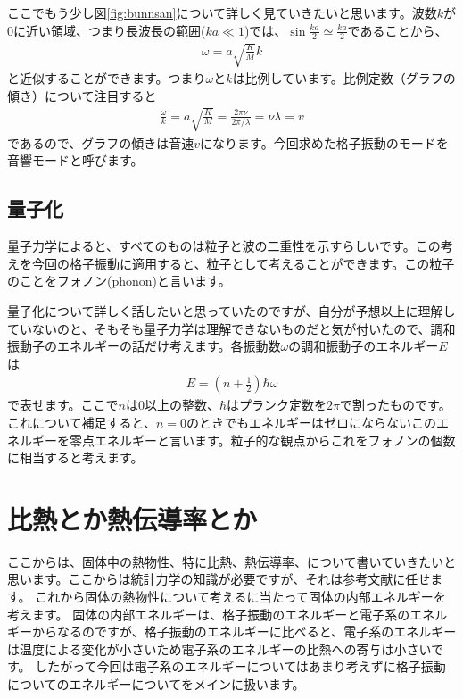 \documentclass[10pt,b5paper,papersize,dvipdfmx]{jsbook}
\begin{document}
ここでもう少し図\ref{fig:bunnsan}について詳しく見ていきたいと思います。波数$k$が$0$に近い領域、つまり長波長の範囲($ka \ll 1$)では、$\sin \frac{ka}{2} \simeq \frac{ka}{2}$であることから、
\begin{align}
  \omega = a \sqrt{\frac{K}{M}}k
\end{align}
と近似することができます。つまり$\omega$と$k$は比例しています。比例定数（グラフの傾き）について注目すると
\begin{align}
  \frac{\omega}{k} =a \sqrt{\frac{K}{M}}= \frac{2\pi\nu}{2\pi/\lambda} = \nu \lambda = v
\end{align}
であるので、グラフの傾きは音速$v$になります。今回求めた格子振動のモードを音響モードと呼びます。

\subsection{量子化}
量子力学によると、すべてのものは粒子と波の二重性を示すらしいです。この考えを今回の格子振動に適用すると、粒子として考えることができます。この粒子のことをフォノン(phonon)と言います。\par
量子化について詳しく話したいと思っていたのですが、自分が予想以上に理解していないのと、そもそも量子力学は理解できないものだと気が付いたので、調和振動子のエネルギーの話だけ考えます。各振動数$\omega$の調和振動子のエネルギー$E$は
\begin{align}
  E = \left(n + \frac{1}{2}\right)\hbar \omega
\end{align}
で表せます。ここで$n$は0以上の整数、$\hbar$はプランク定数を$2\pi$で割ったものです。これについて補足すると、$n = 0$のときでもエネルギーはゼロにならないこのエネルギーを零点エネルギーと言います。粒子的な観点からこれをフォノンの個数に相当すると考えます。


\section{比熱とか熱伝導率とか}
ここからは、固体中の熱物性、特に比熱、熱伝導率、について書いていきたいと思います。ここからは統計力学の知識が必要ですが、それは参考文献に任せます。
これから固体の熱物性について考えるに当たって固体の内部エネルギーを考えます。
固体の内部エネルギーは、格子振動のエネルギーと電子系のエネルギーからなるのですが、格子振動のエネルギーに比べると、電子系のエネルギーは温度による変化が小さいため電子系のエネルギーの比熱への寄与は小さいです。
したがって今回は電子系のエネルギーについてはあまり考えずに格子振動についてのエネルギーについてをメインに扱います。
\end{document}
